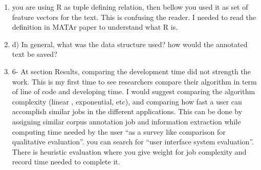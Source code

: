 \begin{enumerate}[leftmargin=0mm,label=\bfseries CommentR3.\arabic*]



\item \label{Review.3.22}
you are using R as tuple defining relation, 
then bellow you used it as set of feature vectors for the text. 
This is confusing the reader. 
I needed to read the definition in MATAr paper to understand 
what R is.




\item \label{Review.3.23}
d) In general, what was the data structure used? 
how would the annotated text be saved?




\item \label{Review.3.24}
6- At section Results, comparing the development time 
did not strength the work. 
This is my first time to see researchers compare their 
algorithm in term of line of code and developing time. 
I would suggest comparing the algorithm complexity 
(linear , exponential, etc), and comparing how fast a user can 
accomplish similar jobs in the different applications. 
This can be done by assigning similar corpus annotation job 
and information extraction while computing time needed by 
the user 
``as a survey like comparison for qualitative evaluation''. 
you can search for ``user interface system evaluation''. 
There is heuristic evaluation where you give weight for job 
complexity and record time needed to complete it.

\end{enumerate}

